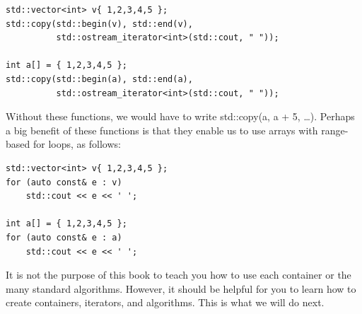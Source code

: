\begin{lstlisting}[style=styleCXX]
std::vector<int> v{ 1,2,3,4,5 };
std::copy(std::begin(v), std::end(v),
		  std::ostream_iterator<int>(std::cout, " "));

int a[] = { 1,2,3,4,5 };
std::copy(std::begin(a), std::end(a),
		  std::ostream_iterator<int>(std::cout, " "));
\end{lstlisting}

Without these functions, we would have to write std::copy(a, a + 5, …). Perhaps a big benefit of these functions is that they enable us to use arrays with range-based for loops, as follows:

\begin{lstlisting}[style=styleCXX]
std::vector<int> v{ 1,2,3,4,5 };
for (auto const& e : v)
	std::cout << e << ' ';

int a[] = { 1,2,3,4,5 };
for (auto const& e : a)
	std::cout << e << ' ';
\end{lstlisting}

It is not the purpose of this book to teach you how to use each container or the many standard algorithms. However, it should be helpful for you to learn how to create containers, iterators, and algorithms. This is what we will do next.






















